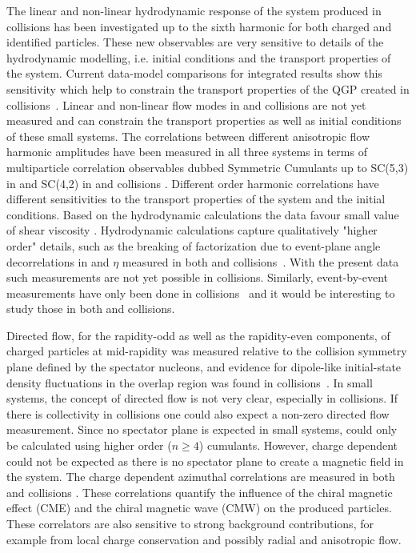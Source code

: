 \documentclass[../report.tex]{subfiles}
\begin{document}
The linear and non-linear hydrodynamic response of the system produced in \PbPb collisions has been investigated up to the sixth harmonic for both charged and identified particles. These new observables are very sensitive to details of the hydrodynamic modelling, i.e. initial conditions and the transport properties of the system. Current data-model comparisons for integrated \pT results show this sensitivity which help to constrain the transport properties of the QGP created in \PbPb collisions~\cite{Acharya:2017zfg}. Linear and non-linear flow modes in \pp and \pPb collisions are not yet measured and can constrain the transport properties as well as initial conditions of these small systems. The correlations between different anisotropic flow harmonic amplitudes have been measured in all three systems in terms of multiparticle correlation observables dubbed Symmetric Cumulants up to SC(5,3) in \PbPb and SC(4,2) in \pPb and \pp collisions \cite{Aad:2014fla,Aad:2015lwa,ALICE:2016kpq,Sirunyan:2017uyl,Acharya:2017gsw,Aaboud:2018syf}. Different order harmonic correlations have different sensitivities to the transport properties of the system and the initial conditions. Based on the hydrodynamic calculations the data favour small value of shear viscosity \cite{Zhu:2016puf}.
Hydrodynamic calculations capture qualitatively "higher order" details, such as the breaking of factorization due to event-plane angle decorrelations in \pT and $\eta$ measured in both \PbPb and \pPb collisions~\cite{Khachatryan:2015oea,Sirunyan:2017gyb,Acharya:2017ino}. With the present data such measurements are not yet possible in \pp collisions. Similarly, event-by-event \vn measurements have only been done in \PbPb collisions~\cite{Aad:2013xma,Sirunyan:2017fts} and it would be interesting to study those in both \pPb and \pp collisions. 

Directed flow, for the rapidity-odd as well as the rapidity-even components, of charged particles at mid-rapidity was measured relative to the collision symmetry plane defined by the spectator nucleons, and evidence for dipole-like initial-state density fluctuations in the overlap region was found in \PbPb collisions~\cite{Abelev:2013cva}. In small systems, the concept of directed flow is not very clear, especially in \pp collisions. If there is collectivity in \pp collisions one could also expect a non-zero directed flow measurement. Since no spectator plane is expected in small systems, \vone could only be calculated using higher order ($n\geq 4$) cumulants. However, charge dependent \vone could not be expected as there is no spectator plane to create a magnetic field in the system. 
The charge dependent azimuthal correlations are measured in both \PbPb and \pPb collisions \cite{Abelev:2014pja,Adam:2015pya,Aamodt:2011kd,CMS:2014mla,Aaboud:2017xpw}. These correlations quantify the influence of the chiral magnetic effect (CME) and the chiral magnetic wave (CMW) on the produced particles. These correlators are also sensitive to strong background contributions, for example from local charge conservation and possibly radial and anisotropic flow. %
\end{document}
